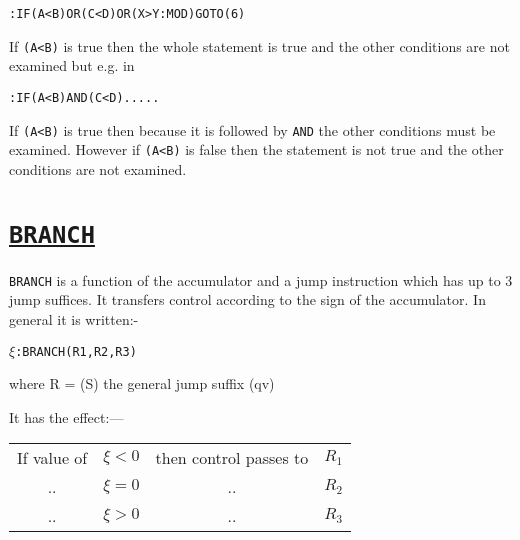 \documentclass[10pt, a4paper, oneside]{article}
\newcommand{\myuline}[1]{\uline{#1}}
\newcommand{\mytt}[1]{\texttt{\scriptsize #1}}
\newcommand{\mytt}[1]{\texttt{\small #1}}
\begin{document}
\begin{multicols}{2}
\begin{enumerate}
\begin{addmargin}[1cm]{1em}%
\begin{lstlisting}
:IF(A<B)OR(C<D)OR(X>Y:MOD)GOTO(6)
\end{lstlisting}
\end{addmargin}

If \mytt{(A<B)} is true then the whole statement is true and
the other conditions are not examined but e.g. in

\begin{addmargin}[1cm]{1em}%
\begin{lstlisting}
:IF(A<B)AND(C<D).....
\end{lstlisting}
\end{addmargin}

If \mytt{(A<B)} is true then because it is followed by \mytt{AND}
the other conditions must be examined.  However if
\mytt{(A<B)} is false then the statement is not true and the
other conditions are not examined.

\end{enumerate}


\section{\myuline{\mytt{BRANCH}}}

\mytt{BRANCH} is a function of the accumulator and a
jump instruction which has up to 3 jump suffices.  It
transfers control according to the sign of the
accumulator. In general it is written:-

\begin{addmargin}[1cm]{1em}%
\vspace{0.2cm}
$\xi$\mytt{:BRANCH(R1,R2,R3)}
\end{addmargin}

\begin{flushleft}
where R = (\rlap{/}S) the general jump suffix (qv)
\end{flushleft}

It has the effect:— \\

\begin{tabular}{clcl}
If value of & $\xi <0$ & then control passes to & $R_{1}$ \\
.. & $\xi =0$ & .. & $R_{2}$ \\
.. & $\xi >0$ & .. & $R_{3}$ \\
\end{tabular}
\vspace{1ex}


\end{multicols}
\end{document}
